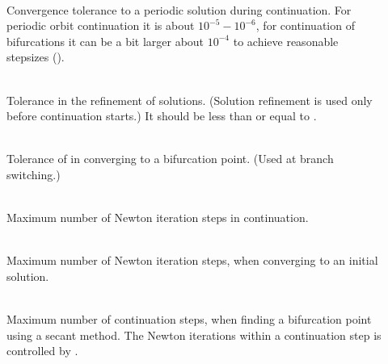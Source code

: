 \documentclass[10pt,a4paper]{ddedoc}
\begin{document}
\begin{description}
%
\item[] ~\\
Convergence tolerance to a periodic solution during continuation. For periodic orbit continuation it is about $10^{-5} - 10^{-6}$, for continuation of bifurcations it can be a bit larger about $10^{-4}$ to achieve reasonable stepsizes ().
%
\item[] ~\\
Tolerance in the refinement of solutions. (Solution refinement is used only before continuation starts.) It should be less than or equal to .
%
\item[] ~\\
Tolerance of  in converging to a bifurcation point. (Used at branch switching.)
%
\item[] ~\\
Maximum number of Newton iteration steps in continuation.
%
\item[] ~\\
Maximum number of Newton iteration steps, when converging to an initial solution.
%
\item[] ~\\
Maximum number of continuation steps, when finding a bifurcation point using a secant method.
The Newton iterations within a continuation step is controlled by .
%
\end{description}
\end{document}
